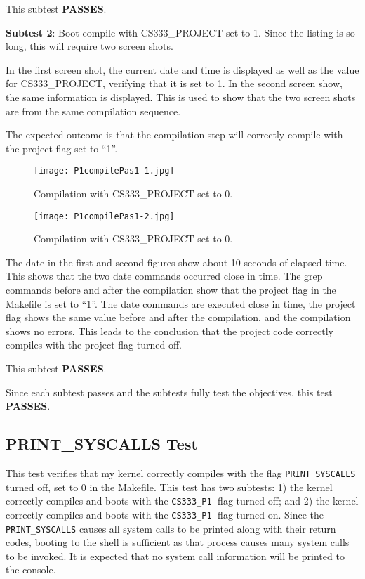 \documentclass[11pt,letterpaper]{report}
\begin{document}
{  This subtest {\bf PASSES}.
  
  {\bf Subtest 2}: Boot compile with  CS333\_PROJECT set to 1. Since the listing is so long, this will require two screen shots.
  
  In the first screen shot, the current date and time is displayed as well as the value for CS333\_PROJECT, verifying that it is set to 1. In the second screen show, the same information is displayed. This is used to show that the two screen shots are from the same compilation sequence.
  
  The expected outcome is that the compilation step will correctly compile with the project flag set to ``1''.

  
\begin{figure}[h!]
	\centering
	\texttt{[image: P1compilePas1-1.jpg]}
	\caption[Part 1: Project flag set to 0]{Compilation with CS333\_PROJECT set to 0.}
	\label{fig:P1compileP1-1}
\end{figure}

\begin{figure}[h!]
	\centering
	\texttt{[image: P1compilePas1-2.jpg]}
	\caption[Part 2: Project flag set to 0]{Compilation with CS333\_PROJECT set to 0.}
	\label{fig:P1compileP1-2}
\end{figure}

The date in the first and second figures show about 10 seconds of elapsed time. This shows that the two date commands occurred close in time. The grep commands before and after the compilation show that the project flag in the Makefile is set to ``1''. The date commands are executed close in time, the project flag shows the same value before and after the compilation, and the compilation shows no errors. This leads to the conclusion that the project code correctly compiles with the project flag turned off.

This subtest {\bf PASSES}.

Since each subtest passes and the subtests fully test the objectives, this test {\bf PASSES}.

  \subsection*{PRINT\_SYSCALLS Test}
  This test verifies that my kernel correctly compiles with the flag {\tt PRINT\_SYSCALLS} turned off, set to 0 in the Makefile.
  This test has two subtests: 1) the kernel correctly compiles and boots with the {\tt CS333\_P1}| flag turned off; and
  2) the kernel correctly compiles and boots with the {\tt CS333\_P1}| flag turned on. Since the {\tt PRINT\_SYSCALLS} 
  causes all system calls to be printed along with their return codes, booting to the shell is sufficient as that
  process causes many system calls to be invoked.
  It is expected that no system call information will be printed to the console.
  
}
\end{document}
